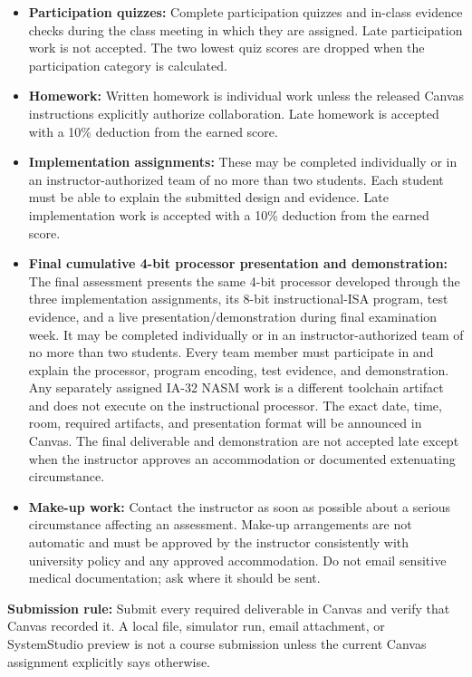 \documentclass[10pt,letterpaper]{article}
\begin{document}
\begin{itemize}
  \item \textbf{Participation quizzes:} Complete participation quizzes and in-class evidence checks during the class meeting in which they are assigned. Late participation work is not accepted. The two lowest quiz scores are dropped when the participation category is calculated.
  \item \textbf{Homework:} Written homework is individual work unless the released Canvas instructions explicitly authorize collaboration. Late homework is accepted with a 10\% deduction from the earned score.
  \item \textbf{Implementation assignments:} These may be completed individually or in an instructor-authorized team of no more than two students. Each student must be able to explain the submitted design and evidence. Late implementation work is accepted with a 10\% deduction from the earned score.
  \item \textbf{Final cumulative 4-bit processor presentation and demonstration:} The final assessment presents the same 4-bit processor developed through the three implementation assignments, its 8-bit instructional-ISA program, test evidence, and a live presentation/demonstration during final examination week. It may be completed individually or in an instructor-authorized team of no more than two students. Every team member must participate in and explain the processor, program encoding, test evidence, and demonstration. Any separately assigned IA-32 NASM work is a different toolchain artifact and does not execute on the instructional processor. The exact date, time, room, required artifacts, and presentation format will be announced in Canvas. The final deliverable and demonstration are not accepted late except when the instructor approves an accommodation or documented extenuating circumstance.
  \item \textbf{Make-up work:} Contact the instructor as soon as possible about a serious circumstance affecting an assessment. Make-up arrangements are not automatic and must be approved by the instructor consistently with university policy and any approved accommodation. Do not email sensitive medical documentation; ask where it should be sent.
\end{itemize}

\textbf{Submission rule:} Submit every required deliverable in Canvas and verify that Canvas recorded it. A local file, simulator run, email attachment, or SystemStudio preview is not a course submission unless the current Canvas assignment explicitly says otherwise.
\end{document}
